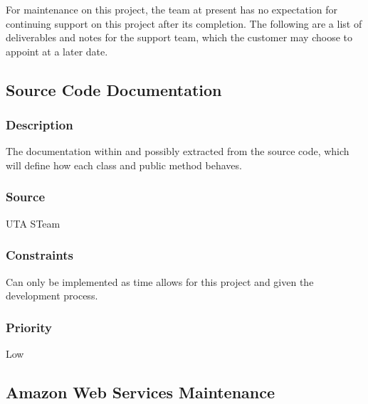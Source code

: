 For maintenance on this project, the team at present has no expectation for continuing support on this project after its completion.  The following are a list of deliverables and notes for the support team, which the customer may choose to appoint at a later date.

\subsection{Source Code Documentation}
\subsubsection{Description}
The documentation within and possibly extracted from the source code, which will define how each class and public method behaves.
\subsubsection{Source}
UTA STeam
\subsubsection{Constraints}
Can only be implemented as time allows for this project and given the development process.
\subsubsection{Priority}
Low

\subsection{Amazon Web Services Maintenance}
